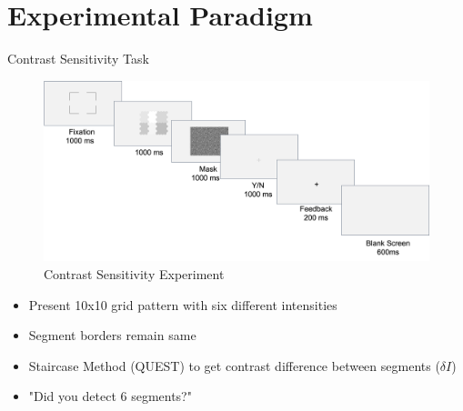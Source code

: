\documentclass[10pt,xcolor=svgnames]{beamer} %
\begin{document}
\section{Experimental Paradigm}
\begin{frame}{Contrast Sensitivity Task}
    \begin{figure}
    \centering
        \includegraphics[width = \textwidth]{pictures/thresholdExpProcedure.png}   
    \caption{\footnotesize Contrast Sensitivity Experiment}
    \end{figure}    

    \begin{itemize}
        \item Present 10x10 grid pattern with six different intensities
        \item Segment borders remain same
        \item Staircase Method (QUEST) to get contrast difference between segments ($\delta I$)
        \item "Did you detect 6 segments?"
    \end{itemize}
\end{frame}
\end{document}
